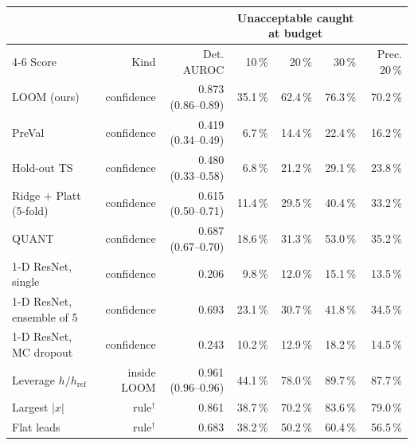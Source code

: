 \begin{tabular}{lrrrrrr}
\toprule
& & & \multicolumn{3}{c}{Unacceptable caught at budget} & \\ \cmidrule(lr){4-6}
Score & Kind & Det. AUROC & 10\,\% & 20\,\% & 30\,\% & Prec. 20\,\% \\
\midrule
LOOM (ours) & confidence & 0.873 (0.86--0.89) & 35.1\,\% & 62.4\,\% & 76.3\,\% & 70.2\,\% \\
PreVal & confidence & 0.419 (0.34--0.49) & 6.7\,\% & 14.4\,\% & 22.4\,\% & 16.2\,\% \\
Hold-out TS & confidence & 0.480 (0.33--0.58) & 6.8\,\% & 21.2\,\% & 29.1\,\% & 23.8\,\% \\
Ridge + Platt (5-fold) & confidence & 0.615 (0.50--0.71) & 11.4\,\% & 29.5\,\% & 40.4\,\% & 33.2\,\% \\
QUANT & confidence & 0.687 (0.67--0.70) & 18.6\,\% & 31.3\,\% & 53.0\,\% & 35.2\,\% \\
1-D ResNet, single & confidence & 0.206 & 9.8\,\% & 12.0\,\% & 15.1\,\% & 13.5\,\% \\
1-D ResNet, ensemble of 5 & confidence & 0.693 & 23.1\,\% & 30.7\,\% & 41.8\,\% & 34.5\,\% \\
1-D ResNet, MC dropout & confidence & 0.243 & 10.2\,\% & 12.9\,\% & 18.2\,\% & 14.5\,\% \\
Leverage $h/h_{\mathrm{ref}}$ & inside LOOM & 0.961 (0.96--0.96) & 44.1\,\% & 78.0\,\% & 89.7\,\% & 87.7\,\% \\
Largest $|x|$ & rule$^{\dagger}$ & 0.861 & 38.7\,\% & 70.2\,\% & 83.6\,\% & 79.0\,\% \\
Flat leads & rule$^{\dagger}$ & 0.683 & 38.2\,\% & 50.2\,\% & 60.4\,\% & 56.5\,\% \\
\bottomrule
\end{tabular}
